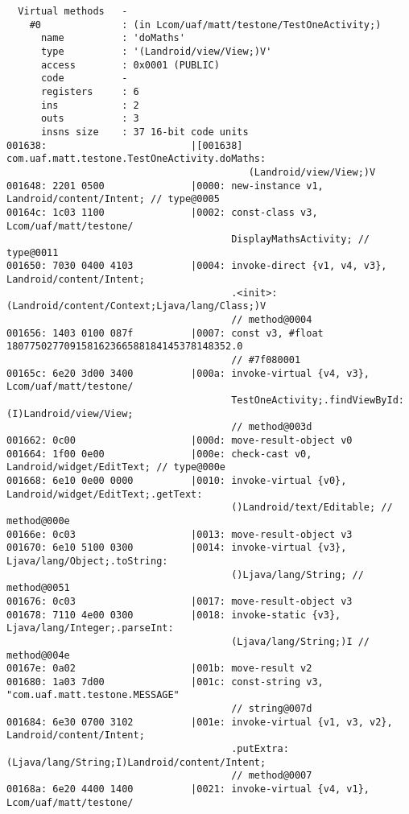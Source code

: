 \begin{lstlisting}
  Virtual methods   -
    #0              : (in Lcom/uaf/matt/testone/TestOneActivity;)
      name          : 'doMaths'
      type          : '(Landroid/view/View;)V'
      access        : 0x0001 (PUBLIC)
      code          -
      registers     : 6
      ins           : 2
      outs          : 3
      insns size    : 37 16-bit code units
001638:                         |[001638] com.uaf.matt.testone.TestOneActivity.doMaths:
                                          (Landroid/view/View;)V
001648: 2201 0500               |0000: new-instance v1, Landroid/content/Intent; // type@0005
00164c: 1c03 1100               |0002: const-class v3, Lcom/uaf/matt/testone/
                                       DisplayMathsActivity; // type@0011
001650: 7030 0400 4103          |0004: invoke-direct {v1, v4, v3}, Landroid/content/Intent;
                                       .<init>:(Landroid/content/Context;Ljava/lang/Class;)V
                                       // method@0004
001656: 1403 0100 087f          |0007: const v3, #float 180775027709158162366588184145378148352.0
                                       // #7f080001
00165c: 6e20 3d00 3400          |000a: invoke-virtual {v4, v3}, Lcom/uaf/matt/testone/
                                       TestOneActivity;.findViewById:(I)Landroid/view/View;
                                       // method@003d
001662: 0c00                    |000d: move-result-object v0
001664: 1f00 0e00               |000e: check-cast v0, Landroid/widget/EditText; // type@000e
001668: 6e10 0e00 0000          |0010: invoke-virtual {v0}, Landroid/widget/EditText;.getText:
                                       ()Landroid/text/Editable; // method@000e
00166e: 0c03                    |0013: move-result-object v3
001670: 6e10 5100 0300          |0014: invoke-virtual {v3}, Ljava/lang/Object;.toString:
                                       ()Ljava/lang/String; // method@0051
001676: 0c03                    |0017: move-result-object v3
001678: 7110 4e00 0300          |0018: invoke-static {v3}, Ljava/lang/Integer;.parseInt:
                                       (Ljava/lang/String;)I // method@004e
00167e: 0a02                    |001b: move-result v2
001680: 1a03 7d00               |001c: const-string v3, "com.uaf.matt.testone.MESSAGE"
                                       // string@007d
001684: 6e30 0700 3102          |001e: invoke-virtual {v1, v3, v2}, Landroid/content/Intent;
                                       .putExtra:(Ljava/lang/String;I)Landroid/content/Intent;
                                       // method@0007
00168a: 6e20 4400 1400          |0021: invoke-virtual {v4, v1}, Lcom/uaf/matt/testone/

\end{lstlisting}

